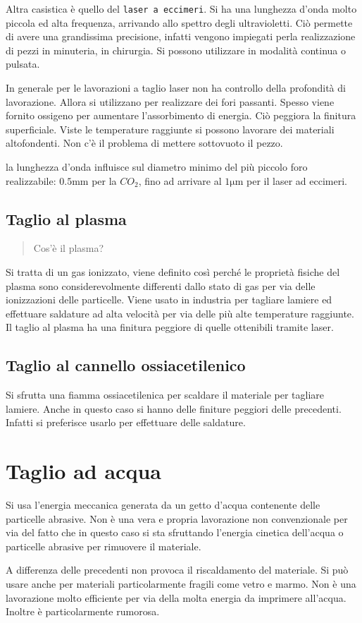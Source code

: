 Altra casistica è quello del \texttt{laser a eccimeri}. Si ha una lunghezza d'onda molto piccola ed alta frequenza, arrivando allo spettro degli ultravioletti. 
Ciò permette di avere una grandissima precisione, infatti vengono impiegati perla realizzazione di pezzi in minuteria, in chirurgia.
Si possono utilizzare in modalità continua o pulsata.

In generale per le lavorazioni a taglio laser non ha controllo della profondità di lavorazione. Allora si utilizzano per realizzare dei fori passanti.
Spesso viene fornito ossigeno per aumentare l'assorbimento di energia.
Ciò peggiora la finitura superficiale. 
Viste le temperature raggiunte si possono lavorare dei materiali altofondenti. Non c'è il problema di mettere sottovuoto il pezzo.

la lunghezza d'onda influisce sul diametro minimo del più piccolo foro realizzabile:
$0.5\unit{\mm}$ per la $CO_2$, fino ad arrivare al $1\unit{\um}$ per il laser ad eccimeri.

\subsection{Taglio al plasma}
\begin{quote}
Cos'è il plasma?
\end{quote}
Si tratta di un gas ionizzato, viene definito così perché le proprietà fisiche del plasma sono considerevolmente differenti dallo stato di gas per via delle ionizzazioni delle particelle.
Viene usato in industria per tagliare lamiere ed effettuare saldature ad alta velocità per via delle più alte temperature raggiunte.
Il taglio al plasma ha una finitura peggiore di quelle ottenibili tramite laser.

\subsection{Taglio al cannello ossiacetilenico}
Si sfrutta una fiamma ossiacetilenica per scaldare il materiale per tagliare lamiere. Anche in questo caso si hanno delle finiture peggiori delle precedenti. Infatti si preferisce usarlo per effettuare delle saldature.

\section{Taglio ad acqua}
Si usa l'energia meccanica generata da un getto d'acqua contenente delle particelle abrasive.
Non è una vera e propria lavorazione non convenzionale per via del fatto che in questo caso si sta sfruttando l'energia cinetica dell'acqua o particelle abrasive per rimuovere il materiale.

A differenza delle precedenti non provoca il riscaldamento del materiale.
Si può usare anche per materiali particolarmente fragili come vetro e marmo.
Non è una lavorazione molto efficiente per via della molta energia da imprimere all'acqua. Inoltre è particolarmente rumorosa.